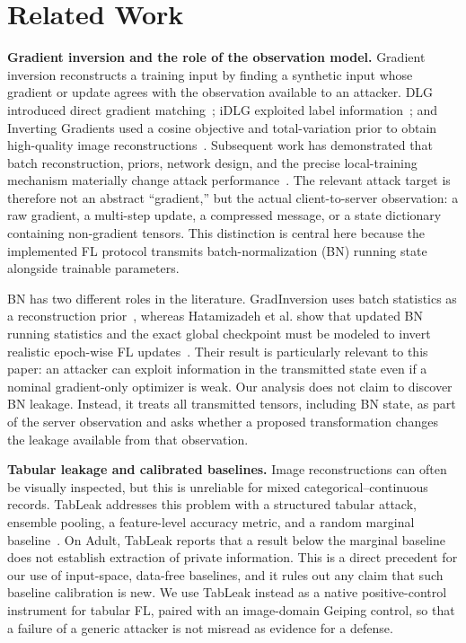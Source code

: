 \section{Related Work}
\label{sec:related_work_reframed}

\textbf{Gradient inversion and the role of the observation model.}
Gradient inversion reconstructs a training input by finding a synthetic input whose gradient or update agrees with the observation available to an attacker. DLG introduced direct gradient matching~\cite{zhu2019dlg}; iDLG exploited label information~\cite{zhao2020idlg}; and Inverting Gradients used a cosine objective and total-variation prior to obtain high-quality image reconstructions~\cite{geiping2020inverting}. Subsequent work has demonstrated that batch reconstruction, priors, network design, and the precise local-training mechanism materially change attack performance~\cite{yin2021gradinversion,wei2020framework,du2025sok}. The relevant attack target is therefore not an abstract ``gradient,'' but the actual client-to-server observation: a raw gradient, a multi-step update, a compressed message, or a state dictionary containing non-gradient tensors. This distinction is central here because the implemented FL protocol transmits batch-normalization (BN) running state alongside trainable parameters.

BN has two different roles in the literature. GradInversion uses batch statistics as a reconstruction prior~\cite{yin2021gradinversion}, whereas Hatamizadeh et al. show that updated BN running statistics and the exact global checkpoint must be modeled to invert realistic epoch-wise FL updates~\cite{hatamizadeh2023gia}. Their result is particularly relevant to this paper: an attacker can exploit information in the transmitted state even if a nominal gradient-only optimizer is weak. Our analysis does not claim to discover BN leakage. Instead, it treats all transmitted tensors, including BN state, as part of the server observation and asks whether a proposed transformation changes the leakage available from that observation.

\textbf{Tabular leakage and calibrated baselines.}
Image reconstructions can often be visually inspected, but this is unreliable for mixed categorical--continuous records. TabLeak addresses this problem with a structured tabular attack, ensemble pooling, a feature-level accuracy metric, and a random marginal baseline~\cite{vero2023tableak}. On Adult, TabLeak reports that a result below the marginal baseline does not establish extraction of private information. This is a direct precedent for our use of input-space, data-free baselines, and it rules out any claim that such baseline calibration is new. We use TabLeak instead as a native positive-control instrument for tabular FL, paired with an image-domain Geiping control, so that a failure of a generic attacker is not misread as evidence for a defense.

